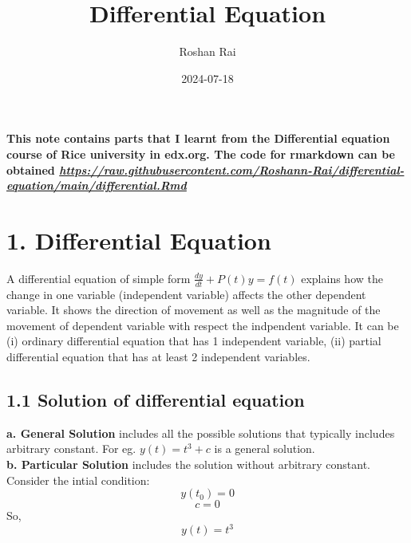 \documentclass[
  11pt,
]{article}
\title{Differential Equation}
\author{Roshan Rai}
\date{2024-07-18}
\begin{document}
\maketitle

\onehalfspacing

\textbf{This note contains parts that I learnt from the Differential
equation course of Rice university in edx.org. The code for rmarkdown
can be obtained
\href{https://raw.githubusercontent.com/Roshann-Rai/differential-equation/main/differential.Rmd}{\emph{https://raw.githubusercontent.com/Roshann-Rai/differential-equation/main/differential.Rmd}}}

\section{1. Differential Equation}\label{differential-equation}

A differential equation of simple form \(\frac{dy}{dt} + P(t)y = f(t)\)
explains how the change in one variable (independent variable) affects
the other dependent variable. It shows the direction of movement as well
as the magnitude of the movement of dependent variable with respect the
indpendent variable. It can be (i) ordinary differential equation that
has 1 independent variable, (ii) partial differential equation that has
at least 2 independent variables.

\subsection{1.1 Solution of differential
equation}\label{solution-of-differential-equation}

\textbf{a. General Solution} includes all the possible solutions that
typically includes arbitrary constant. For eg. \(y(t) = t^3 + c\) is a
general solution.\\
\textbf{b. Particular Solution} includes the solution without arbitrary
constant. Consider the intial condition: \[y(t_0) = 0\] \[c = 0\] So,
\[y(t) = t^3\] \clearpage
\end{document}
